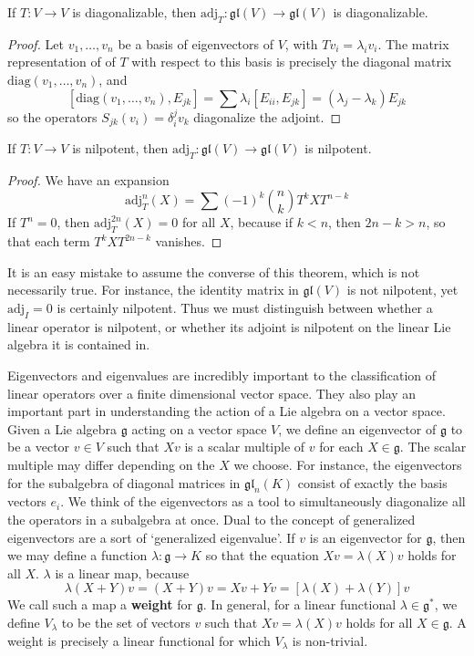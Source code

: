 \begin{theorem}
    If $T: V \to V$ is diagonalizable, then $\text{adj}_T: \mathfrak{gl}(V) \to \mathfrak{gl}(V)$ is diagonalizable.
\end{theorem}
\begin{proof}
    Let $v_1, \dots, v_n$ be a basis of eigenvectors of $V$, with $Tv_i = \lambda_i v_i$. The matrix representation of of $T$ with respect to this basis is precisely the diagonal matrix $\text{diag}(v_1, \dots, v_n)$, and
    \[ [\text{diag}(v_1, \dots, v_n), E_{jk}] = \sum \lambda_i [ E_{ii}, E_{jk} ] = (\lambda_j - \lambda_k) E_{jk} \]
    so the operators $S_{jk}(v_i) = \delta_i^j v_k$ diagonalize the adjoint.
\end{proof}

\begin{theorem}
    If $T: V \to V$ is nilpotent, then $\text{adj}_T: \mathfrak{gl}(V) \to \mathfrak{gl}(V)$ is nilpotent.
\end{theorem}
\begin{proof}
    We have an expansion
    \[ \text{adj}_T^n(X) = \sum (-1)^k {n \choose k} T^kXT^{n-k} \]
    If $T^n = 0$, then $\text{adj}_T^{2n}(X) = 0$ for all $X$, because if $k < n$, then $2n - k > n$, so that each term $T^kXT^{2n-k}$ vanishes.
\end{proof}

It is an easy mistake to assume the converse of this theorem, which is not necessarily true. For instance, the identity matrix in $\mathfrak{gl}(V)$ is not nilpotent, yet $\text{adj}_I = 0$ is certainly nilpotent. Thus we must distinguish between whether a linear operator is nilpotent, or whether its adjoint is nilpotent on the linear Lie algebra it is contained in.

Eigenvectors and eigenvalues are incredibly important to the classification of linear operators over a finite dimensional vector space. They also play an important part in understanding the action of a Lie algebra on a vector space. Given a Lie algebra $\mathfrak{g}$ acting on a vector space $V$, we define an eigenvector of $\mathfrak{g}$ to be a vector $v \in V$ such that $Xv$ is a scalar multiple of $v$ for each $X \in \mathfrak{g}$. The scalar multiple may differ depending on the $X$ we choose. For instance, the eigenvectors for the subalgebra of diagonal matrices in $\mathfrak{gl}_n(K)$ consist of exactly the basis vectors $e_i$. We think of the eigenvectors as a tool to simultaneously diagonalize all the operators in a subalgebra at once. Dual to the concept of generalized eigenvectors are a sort of `generalized eigenvalue'. If $v$ is an eigenvector for $\mathfrak{g}$, then we may define a function $\lambda: \mathfrak{g} \to K$ so that the equation $Xv = \lambda(X) v$ holds for all $X$. $\lambda$ is a linear map, because
%
\[ \lambda(X + Y)v = (X + Y)v = Xv + Yv = [\lambda(X) + \lambda(Y)]v \]
%
We call such a map a {\bf weight} for $\mathfrak{g}$. In general, for a linear functional $\lambda \in \mathfrak{g}^*$, we define $V_\lambda$ to be the set of vectors $v$ such that $Xv = \lambda(X)v$ holds for all $X \in \mathfrak{g}$. A weight is precisely a linear functional for which $V_\lambda$ is non-trivial.

